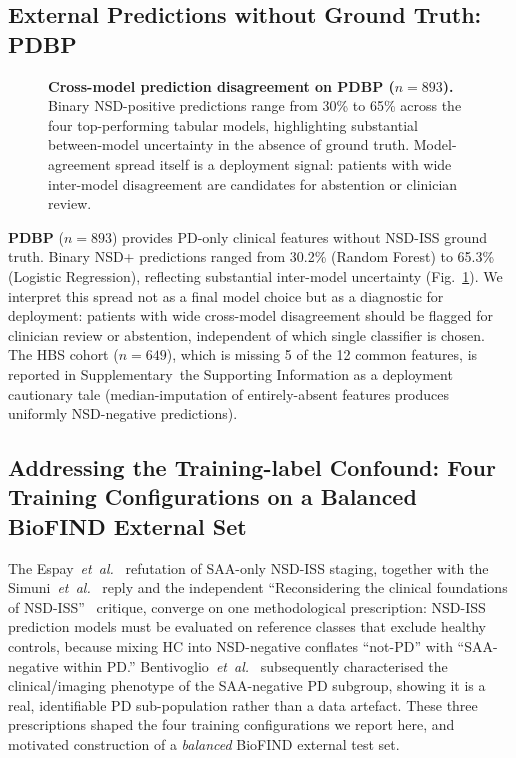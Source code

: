 \documentclass[10pt,letterpaper]{article}
\begin{document}
\subsection*{External Predictions without Ground Truth: PDBP}

\begin{figure}[!t]

\caption{\textbf{Cross-model prediction disagreement on PDBP ($n{=}893$).} Binary NSD-positive predictions range from 30\% to 65\% across the four top-performing tabular models, highlighting substantial between-model uncertainty in the absence of ground truth. Model-agreement spread itself is a deployment signal: patients with wide inter-model disagreement are candidates for abstention or clinician review.}
\label{p1:fig:agreement}
\end{figure}

\textbf{PDBP} ($n{=}893$) provides PD-only clinical features without NSD-ISS ground truth. Binary NSD+ predictions ranged from 30.2\% (Random Forest) to 65.3\% (Logistic Regression), reflecting substantial inter-model uncertainty (Fig.~\ref{p1:fig:agreement}). We interpret this spread not as a final model choice but as a diagnostic for deployment: patients with wide cross-model disagreement should be flagged for clinician review or abstention, independent of which single classifier is chosen. The HBS cohort ($n{=}649$), which is missing 5 of the 12 common features, is reported in Supplementary~the Supporting Information as a deployment cautionary tale (median-imputation of entirely-absent features produces uniformly NSD-negative predictions).

\subsection*{Addressing the Training-label Confound: Four Training Configurations on a Balanced BioFIND External Set}
\label{p1:sec:results:pdonly}

The Espay~\textit{et~al.}~\cite{espay2025refutation} refutation of SAA-only NSD-ISS staging, together with the Simuni~\textit{et~al.}~\cite{simuni2025reply} reply and the independent ``Reconsidering the clinical foundations of NSD-ISS''~\cite{reconsider2025nsd} critique, converge on one methodological prescription: NSD-ISS prediction models must be evaluated on reference classes that exclude healthy controls, because mixing HC into NSD-negative conflates ``not-PD'' with ``SAA-negative within PD.'' Bentivoglio~\textit{et~al.}~\cite{bentivoglio2026saaneg} subsequently characterised the clinical/imaging phenotype of the SAA-negative PD subgroup, showing it is a real, identifiable PD sub-population rather than a data artefact. These three prescriptions shaped the four training configurations we report here, and motivated construction of a \emph{balanced} BioFIND external test set.
\end{document}
